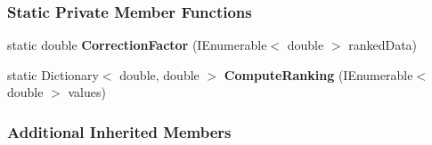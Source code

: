 \subsubsection*{Static Private Member Functions}
\begin{DoxyCompactItemize}
\item 
\mbox{\label{classDataTools_1_1correlation_1_1SpearmanCorrelation_a0151ce0fb7c5dcdd0914aa76098e7d0b}} 
static double {\bfseries Correction\+Factor} (I\+Enumerable$<$ double $>$ ranked\+Data)
\item 
\mbox{\label{classDataTools_1_1correlation_1_1SpearmanCorrelation_a949fb26c943e862840cf882f9a3afd70}} 
static Dictionary$<$ double, double $>$ {\bfseries Compute\+Ranking} (I\+Enumerable$<$ double $>$ values)
\end{DoxyCompactItemize}
\subsubsection*{Additional Inherited Members}
